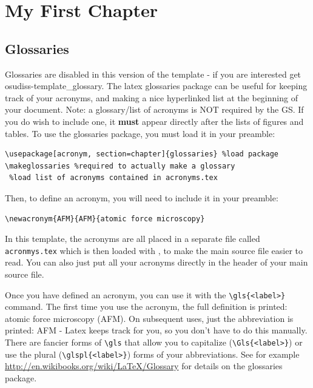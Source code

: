 \chapter{My First Chapter}
\begin{quote}
\lipsum[1]
\end{quote}

\lipsum[1-3]


\section{Glossaries}
Glossaries are disabled in this version of the template - if you are interested get osudiss-template\_glossary.
The latex glossaries package can be useful for keeping track of your acronyms, and making a nice hyperlinked 
list at the beginning of your document.  Note: a glossary/list of acronyms is NOT required by the GS.
If you do wish to include one, it \textbf{must} appear directly after the lists of figures and tables.
To use the glossaries package, you must load it in your preamble:
\begin{verbatim}
\usepackage[acronym, section=chapter]{glossaries} %load package
\makeglossaries %required to actually make a glossary
 %load list of acronyms contained in acronyms.tex
\end{verbatim}
Then, to define an acronym, you will need to include it in your preamble:
\begin{verbatim}
\newacronym{AFM}{AFM}{atomic force microscopy}
\end{verbatim}
In this template, the acronyms are all placed in a separate file called
\verb#acronmys.tex# which is then loaded with \verb##, to
make the main source file easier to read.  You can also just put all
your acronyms directly in the header of your main source file.

Once you have defined an acronym, you can use it with the \verb#\gls{<label>}# command.
The first time you use the acronym, the full definition is printed: atomic force microscopy (AFM). %
On subsequent uses, just the abbreviation is printed: AFM %
 - Latex keeps track
for you, so you don't have to do this manually.  There are fancier forms
of \verb#\gls# that allow you to capitalize (\verb#\Gls{<label>}#) or use the 
plural (\verb#\glspl{<label>}#) forms of your abbreviations.  See 
for example \url{http://en.wikibooks.org/wiki/LaTeX/Glossary} for details
on the glossaries package.

